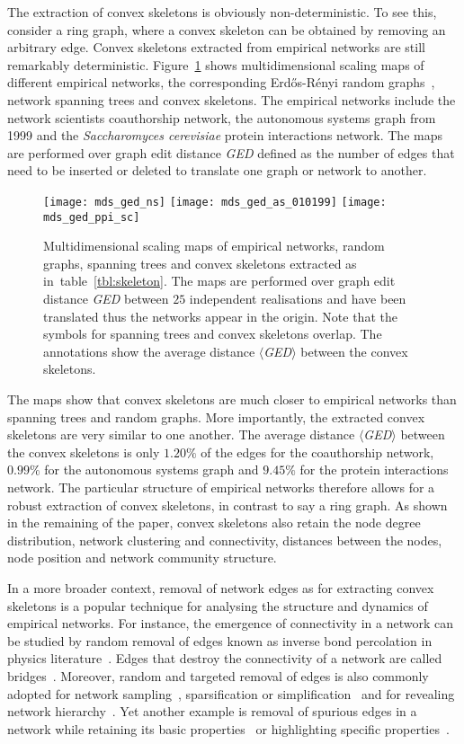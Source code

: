 \documentclass[]{rsif}
\newcommand{\Figref}[1]{Figure~\ref{fig:#1}\xspace}
\newcommand{\tblref}[1]{table~\ref{tbl:#1}\xspace}
\newcommand{\scere}{\emph{Saccharomyces cerevisiae}\xspace}
\begin{document}
The extraction of convex skeletons is obviously non-deterministic. To see this, consider a ring graph, where a convex skeleton can be obtained by removing an arbitrary edge. Convex skeletons extracted from empirical networks are still remarkably deterministic. \Figref{mds} shows multidimensional scaling maps of different empirical networks, the corresponding Erd\H{o}s-R\'{e}nyi random graphs~\cite{ER59}, network spanning trees and convex skeletons. The empirical networks include the network scientists coauthorship network, the autonomous systems graph from 1999 and the \scere protein interactions network. The maps are performed over graph edit distance {\it GED} defined as the number of edges that need to be inserted or deleted to translate one graph or network to another.

\begin{figure}[t]
	\centering\texttt{[image: mds\_ged\_ns]}\textwidth%
	\texttt{[image: mds\_ged\_as\_010199]}\textwidth%
	\texttt{[image: mds\_ged\_ppi\_sc]}%
	\caption{\label{fig:mds}Multidimensional scaling maps of empirical networks, random graphs, spanning trees and convex skeletons extracted as in~\tblref{skeleton}. The maps are performed over graph edit distance {\it GED} between $25$ independent realisations and have been translated thus the networks appear in the origin. Note that the symbols for spanning trees and convex skeletons overlap. The annotations show the average distance $\langle${\it GED}$\rangle$ between the convex skeletons.} 
\end{figure}

The maps show that convex skeletons are much closer to empirical networks than spanning trees and random graphs. More importantly, the extracted convex skeletons are very similar to one another. The average distance $\langle${\it GED}$\rangle$ between the convex skeletons is only $1.20\%$ of the edges for the coauthorship network, $0.99\%$ for the autonomous systems graph and $9.45\%$ for the protein interactions network. The particular structure of empirical networks therefore allows for a robust extraction of convex skeletons, in contrast to say a ring graph. As shown in the remaining of the paper, convex skeletons also retain the node degree distribution, network clustering and connectivity, distances between the nodes, node position and network community structure.

In a more broader context, removal of network edges as for extracting convex skeletons is a popular technique for analysing the structure and dynamics of empirical networks. For instance, the emergence of connectivity in a network can be studied by random removal of edges known as inverse bond percolation in physics literature~\cite{Bar16}. Edges that destroy the connectivity of a network are called bridges~\cite{WTL18}. Moreover, random and targeted removal of edges is also commonly adopted for network sampling~\cite{BSB17}, sparsification or simplification~\cite{CN17} and for revealing network hierarchy~\cite{Cos18}. Yet another example is removal of spurious edges in a network while retaining its basic properties~\cite{ZC12} or highlighting specific properties~\cite{VSKLBLW11}.
\end{document}
